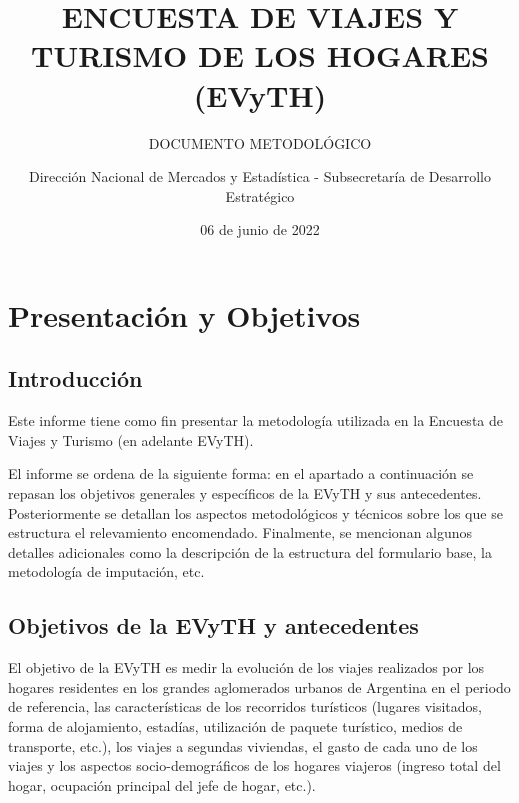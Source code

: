 \documentclass[
  openany]{book}
\title{ENCUESTA DE VIAJES Y TURISMO DE LOS HOGARES (EVyTH)}
\subtitle{DOCUMENTO METODOLÓGICO}
\author{Dirección Nacional de Mercados y Estadística - Subsecretaría de Desarrollo Estratégico}
\date{06 de junio de 2022}
\let\oldmaketitle\maketitle
\begin{document}
\maketitle


\newpage

\let\maketitle\oldmaketitle
\maketitle

{
\setcounter{tocdepth}{1}
\tableofcontents
}
\hypertarget{presentacion-objetivos}{%
\chapter{\texorpdfstring{\textbf{Presentación y Objetivos}}{Presentación y Objetivos}}\label{presentacion-objetivos}}

\hypertarget{introducciuxf3n}{%
\section{Introducción}\label{introducciuxf3n}}

Este informe tiene como fin presentar la metodología utilizada en la Encuesta de Viajes y Turismo (en adelante EVyTH).

El informe se ordena de la siguiente forma: en el apartado a continuación se repasan los objetivos generales y específicos de la EVyTH y sus antecedentes. Posteriormente se detallan los aspectos metodológicos y técnicos sobre los que se estructura el relevamiento encomendado. Finalmente, se mencionan algunos detalles adicionales como la descripción de la estructura del formulario base, la metodología de imputación, etc.

\hypertarget{objetivos-de-la-evyth-y-antecedentes}{%
\section{Objetivos de la EVyTH y antecedentes}\label{objetivos-de-la-evyth-y-antecedentes}}

El objetivo de la EVyTH es medir la evolución de los viajes realizados por los hogares residentes en los grandes aglomerados urbanos de Argentina en el periodo de referencia, las características de los recorridos turísticos (lugares visitados, forma de alojamiento, estadías, utilización de paquete turístico, medios de transporte, etc.), los viajes a segundas viviendas, el gasto de cada uno de los viajes y los aspectos socio-demográficos de los hogares viajeros (ingreso total del hogar, ocupación principal del jefe de hogar, etc.).
\end{document}
